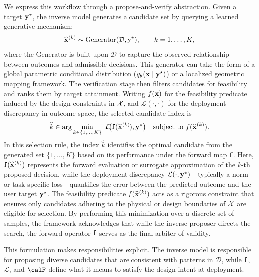 We express this workflow through a propose-and-verify abstraction. Given a target $\mathbf{y}^\star$, the inverse model generates a candidate set by querying a learned generative mechanism:
\begin{equation}
  \widehat{\mathbf{x}}^{(k)} \sim \text{Generator}(\mathcal{D}, \mathbf{y}^\star),\qquad k=1,\dots,K,
  \label{eq:propose}
\end{equation}
where the Generator is built upon $\mathcal{D}$ to capture the observed relationship between outcomes and admissible decisions. This generator can take the form of a global parametric conditional distribution ($q_\theta(\mathbf{x}\mid\mathbf{y}^\star)$) or a localized geometric mapping framework. The verification stage then filters candidates for feasibility and ranks them by target attainment. Writing $f(\mathbf{x})$ for the feasibility predicate induced by the design constraints in $\mathcal{X}$, and $\mathcal{L}(\cdot,\cdot)$ for the deployment discrepancy in outcome space, the selected candidate index is
\begin{equation}
  \widehat{k}\in\arg\min_{k\in\{1,\dots,K\}}
  \ \mathcal{L}\!\big(\vect{f}(\widehat{\vect{x}}^{(k)}),\vect{y}^\star\big)
  \quad \text{subject to }f(\widehat{\vect{x}}^{(k)}).
  \label{eq:verify_select}
\end{equation}
In this selection rule, the index $\widehat{k}$ identifies the optimal candidate from the generated set $\{1, \dots, K\}$ based on its performance under the forward map $\mathbf{f}$. Here, $\mathbf{f}(\widehat{\mathbf{x}}^{(k)})$ represents the forward evaluation or surrogate approximation of the $k$-th proposed decision, while the deployment discrepancy $\mathcal{L}(\cdot, \mathbf{y}^\star)$—typically a norm or task-specific loss—quantifies the error between the predicted outcome and the user target $\mathbf{y}^\star$. The feasibility predicate $f(\widehat{\mathbf{x}}^{(k)})$ acts as a rigorous constraint that ensures only candidates adhering to the physical or design boundaries of $\mathcal{X}$ are eligible for selection. By performing this minimization over a discrete set of samples, the framework acknowledges that while the inverse proposer directs the search, the forward operator $\mathbf{f}$ serves as the final arbiter of validity.

This formulation makes responsibilities explicit. The inverse model is responsible for proposing diverse candidates that are consistent with patterns in $\mathcal{D}$, while $\mathbf{f}$, $\mathcal{L}$, and $\calF$ define what it means to satisfy the design intent at deployment.


